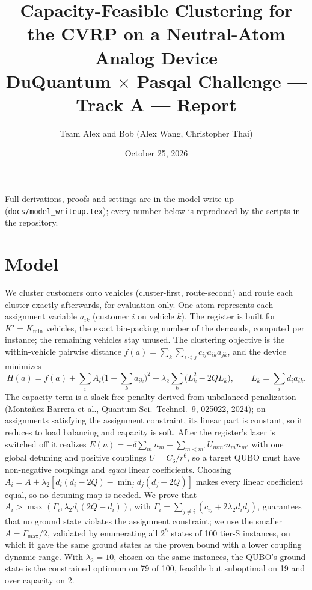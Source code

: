 \documentclass[10pt]{article}
\title{\vspace{-1.5em}Capacity-Feasible Clustering for the CVRP on a Neutral-Atom Analog Device\\
\large DuQuantum $\times$ Pasqal Challenge --- Track A --- Report}
\author{Team Alex and Bob (Alex Wang, Christopher Thai)}
\date{\vspace{-1em}October 25, 2026}
\begin{document}
\maketitle
\vspace{-1.5em}
\noindent Full derivations, proofs and settings are in the model write-up (\texttt{docs/model\_writeup.tex}); every
number below is reproduced by the scripts in the repository.

\section{Model}
We cluster customers onto vehicles (cluster-first, route-second) and route each cluster exactly afterwards, for
evaluation only. One atom represents each assignment variable $a_{ik}$ (customer $i$ on vehicle $k$). The register is
built for $K'=K_{\min}$ vehicles, the exact bin-packing number of the demands, computed per instance; the remaining
vehicles stay unused. The clustering objective is the within-vehicle pairwise distance
$f(a)=\sum_k\sum_{i<j}c_{ij}a_{ik}a_{jk}$, and the device minimizes
\[
  H(a)=f(a)+\sum_iA_i\Big(1-\sum_ka_{ik}\Big)^2+\lambda_2\sum_k\big(L_k^2-2QL_k\big),\qquad L_k=\sum_id_ia_{ik}.
\]
The capacity term is a slack-free penalty derived from unbalanced penalization (Monta\~nez-Barrera et al., Quantum Sci.\
Technol.\ 9, 025022, 2024); on assignments satisfying the assignment constraint, its linear part is constant, so it
reduces to load balancing and capacity is soft. After the register's laser is switched off it realizes
$E(n)=-\delta\sum_mn_m+\sum_{m<m'}U_{mm'}n_mn_{m'}$ with one global detuning and positive couplings
$U=C_6/r^6$, so a target QUBO must have non-negative couplings and \emph{equal} linear coefficients. Choosing
$A_i=A+\lambda_2[d_i(d_i-2Q)-\min_jd_j(d_j-2Q)]$ makes every linear coefficient equal, so no detuning map is needed. We
prove that $A_i>\max(\Gamma_i,\lambda_2d_i(2Q-d_i))$, with $\Gamma_i=\sum_{j\ne i}(c_{ij}+2\lambda_2d_id_j)$, guarantees that no
ground state violates the assignment constraint; we use the smaller $A=\Gamma_{\max}/2$, validated by enumerating all
$2^{8}$ states of 100 tier-S instances, on which it gave the same ground states as the proven bound with a lower
coupling dynamic range. With $\lambda_2=10$, chosen on the same instances, the QUBO's ground state is the constrained
optimum on 79 of 100, feasible but suboptimal on 19 and over capacity on 2.
\end{document}
